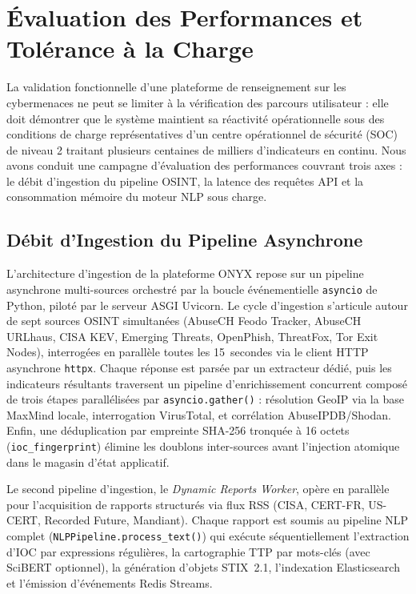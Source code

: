 \section{Évaluation des Performances et Tolérance à la Charge}

La validation fonctionnelle d'une plateforme de renseignement sur les cybermenaces ne peut se limiter à la vérification des parcours utilisateur : elle doit démontrer que le système maintient sa réactivité opérationnelle sous des conditions de charge représentatives d'un centre opérationnel de sécurité (SOC) de niveau 2 traitant plusieurs centaines de milliers d'indicateurs en continu. Nous avons conduit une campagne d'évaluation des performances couvrant trois axes : le débit d'ingestion du pipeline OSINT, la latence des requêtes API et la consommation mémoire du moteur NLP sous charge.

\subsection{Débit d'Ingestion du Pipeline Asynchrone}

L'architecture d'ingestion de la plateforme ONYX repose sur un pipeline asynchrone multi-sources orchestré par la boucle événementielle \texttt{asyncio} de Python, piloté par le serveur ASGI Uvicorn. Le cycle d'ingestion s'articule autour de sept sources OSINT simultanées (AbuseCH Feodo Tracker, AbuseCH URLhaus, CISA KEV, Emerging Threats, OpenPhish, ThreatFox, Tor Exit Nodes), interrogées en parallèle toutes les 15~secondes via le client HTTP asynchrone \texttt{httpx}. Chaque réponse est parsée par un extracteur dédié, puis les indicateurs résultants traversent un pipeline d'enrichissement concurrent composé de trois étapes parallélisées par \texttt{asyncio.gather()} : résolution GeoIP via la base MaxMind locale, interrogation VirusTotal, et corrélation AbuseIPDB/Shodan. Enfin, une déduplication par empreinte SHA-256 tronquée à 16 octets (\texttt{ioc\_fingerprint}) élimine les doublons inter-sources avant l'injection atomique dans le magasin d'état applicatif.

Le second pipeline d'ingestion, le \textit{Dynamic Reports Worker}, opère en parallèle pour l'acquisition de rapports structurés via flux RSS (CISA, CERT-FR, US-CERT, Recorded Future, Mandiant). Chaque rapport est soumis au pipeline NLP complet (\texttt{NLPPipeline.process\_text()}) qui exécute séquentiellement l'extraction d'IOC par expressions régulières, la cartographie TTP par mots-clés (avec SciBERT optionnel), la génération d'objets STIX~2.1, l'indexation Elasticsearch et l'émission d'événements Redis Streams.

